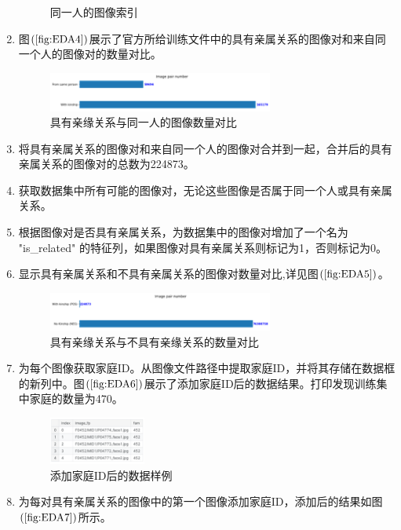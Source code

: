 \documentclass[UTF8]{ctexart}
\begin{document}
\begin{enumerate}
\begin{figure}[!ht]
    \caption{同一人的图像索引}
    \label{fig:EDA3}
  \end{figure}
  \item 图$\left(\ref{fig:EDA4}\right)$展示了官方所给训练文件中的具有亲属关系的图像对和来自同一个人的图像对的数量对比。
  \begin{figure}[!ht]
    \centering
    \includegraphics[width=0.7\textwidth]{EDA4.png}
    \caption{具有亲缘关系与同一人的图像数量对比}
    \label{fig:EDA4}
  \end{figure}
  \item 将具有亲属关系的图像对和来自同一个人的图像对合并到一起，合并后的具有亲属关系的图像对的总数为224873。
  \item 获取数据集中所有可能的图像对，无论这些图像是否属于同一个人或具有亲属关系。
  \item 根据图像对是否具有亲属关系，为数据集中的图像对增加了一个名为 "is\_related" 的特征列，如果图像对具有亲属关系则标记为1，否则标记为0。
  \item 显示具有亲属关系和不具有亲属关系的图像对数量对比,详见图$\left(\ref{fig:EDA5}\right)$。
  \begin{figure}[!ht]
    \centering
    \includegraphics[width=0.7\textwidth]{EDA5.png}
    \caption{具有亲缘关系与不具有亲缘关系的数量对比}
    \label{fig:EDA5}
  \end{figure}
  \item 为每个图像获取家庭ID。从图像文件路径中提取家庭ID，并将其存储在数据框的新列中。图$\left(\ref{fig:EDA6}\right)$展示了添加家庭ID后的数据结果。打印发现训练集中家庭的数量为470。
  \begin{figure}[!ht]
    \centering
    \includegraphics[width=0.3\textwidth]{EDA6.png}
    \caption{添加家庭ID后的数据样例}
    \label{fig:EDA6}
  \end{figure}
  \item 为每对具有亲属关系的图像中的第一个图像添加家庭ID，添加后的结果如图$\left(\ref{fig:EDA7}\right)$所示。

\end{enumerate}
\end{document}
